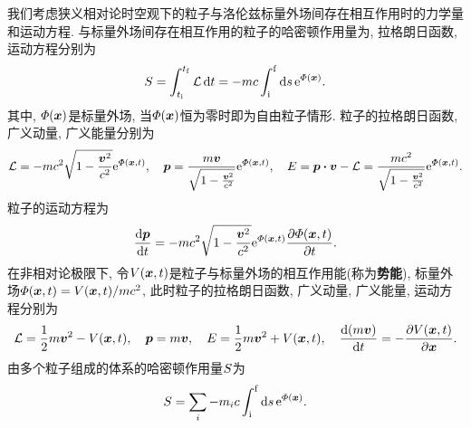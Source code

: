 我们考虑狭义相对论时空观下的粒子与洛伦兹标量外场间存在相互作用时的力学量和运动方程. 与标量外场间存在相互作用的粒子的哈密顿作用量为, 拉格朗日函数, 运动方程分别为
\begin{equation*}
    S = \int_{t_{\mathrm{i}}}^{t_{\mathrm{f}}} \mathcal{L} \dd{t} = -mc \int_{\mathrm{i}}^{\mathrm{f}} \dd{s} \mathrm{e}^{\varPhi(\vb*{x})}.
\end{equation*}
其中, $ \varPhi(\vb*{x}) $是标量外场, 当$ \varPhi(\vb*{x}) $恒为零时即为自由粒子情形. 粒子的拉格朗日函数, 广义动量, 广义能量分别为
\begin{equation*}
    \lagr = -mc^2 \sqrt{1-\frac{\vb*{v}^2}{c^2}} \enum^{\varPhi(\vb*{x},t)}, \quad \vb*{p} = \frac{m\vb*{v}}{\sqrt{1-\frac{\vb*{v}^2}{c^2}}} \enum^{\varPhi(\vb*{x},t)}, \quad E = \vb*{p} \vdot \vb*{v} - \lagr = \frac{mc^2}{\sqrt{1-\frac{\vb*{v}^2}{c^2}}} \enum^{\varPhi(\vb*{x},t)}.
\end{equation*}
粒子的运动方程为
\begin{equation}
    \dv{\vb*{p}}{t} = -mc^2 \sqrt{1-\frac{\vb*{v}^2}{c^2}} \mathrm{e}^{\varPhi(\vb*{x},t)} \pdv{\varPhi(\vb*{x},t)}{t}.
\end{equation}
在非相对论极限下, 令$ V(\vb*{x},t) $是粒子与标量外场的相互作用能(称为\textbf{势能}), 标量外场$ \varPhi(\vb*{x},t)=V(\vb*{x},t)/mc^2 $, 此时粒子的拉格朗日函数, 广义动量, 广义能量, 运动方程分别为
\begin{equation*}
    \mathcal{L} = \frac{1}{2} m\vb*{v}^2 - V(\vb*{x},t), \quad \vb*{p} = m \vb*{v} , \quad E = \frac{1}{2} m\vb*{v}^2 + V(\vb*{x},t),\quad \dv{(m\vb*{v})}{t} = -\pdv{V(\vb*{x},t)}{\vb*{x}}.
\end{equation*}
由多个粒子组成的体系的哈密顿作用量$ S $为
\begin{equation*}
    S = \sum_i -m_i c \int_{\mathrm{i}}^{\mathrm{f}} \dd{s} \mathrm{e}^{\varPhi(\vb*{x})}.
\end{equation*}


